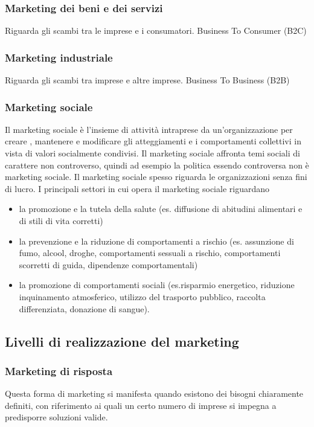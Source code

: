 \subsubsection*{Marketing dei beni e dei servizi} 
Riguarda gli scambi tra le imprese e i consumatori. Business To Consumer (B2C)
\subsubsection*{Marketing industriale} 
Riguarda gli scambi tra imprese e altre imprese. Business To Business (B2B)
\subsubsection*{Marketing sociale}
Il marketing sociale è l’insieme di attività intraprese da un’organizzazione per creare , mantenere e modificare gli atteggiamenti e i comportamenti collettivi in vista di valori socialmente condivisi. \newline
Il marketing sociale affronta temi sociali di carattere non controverso, quindi ad esempio la politica essendo controversa non è marketing sociale. \newline
Il marketing sociale spesso riguarda le organizzazioni senza fini di lucro. \newline
I principali settori in cui opera il marketing sociale riguardano
\begin{itemize}
	\item  la promozione e la tutela della salute (es. diffusione di abitudini alimentari e di stili di vita corretti)
	\item  la prevenzione e la riduzione di comportamenti a rischio (es. assunzione di fumo, alcool, droghe, comportamenti sessuali a rischio, comportamenti scorretti di guida, dipendenze comportamentali)
	\item la promozione di comportamenti sociali (es.risparmio energetico, riduzione inquinamento atmosferico, utilizzo del trasporto pubblico, raccolta  differenziata, donazione di sangue).
\end{itemize}

\subsection{Livelli di realizzazione del marketing}
\subsubsection*{Marketing di risposta}
Questa forma di marketing si manifesta quando esistono dei bisogni chiaramente definiti, con riferimento ai quali un certo numero di imprese si impegna a predisporre soluzioni valide.

